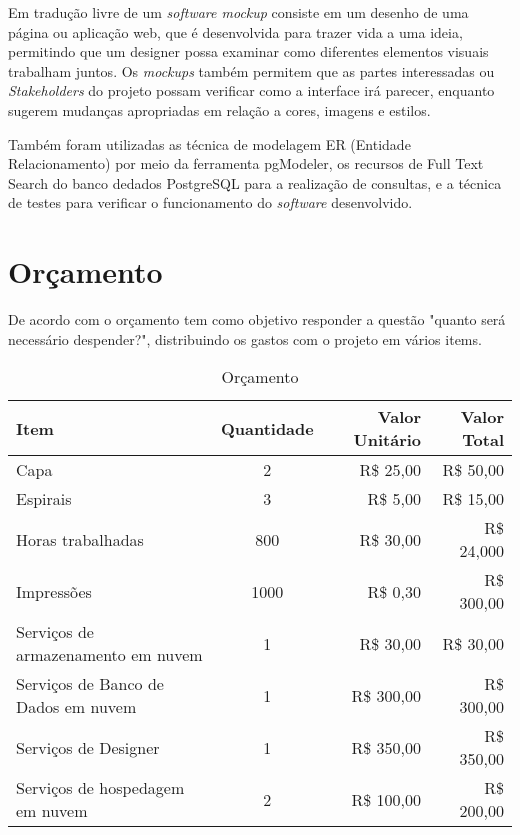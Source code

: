 Em tradução livre de \cite{uzayr:mockups} um \emph{software mockup}
consiste em um desenho de uma página ou aplicação web,
que é desenvolvida para trazer vida a uma ideia, permitindo
que um designer possa examinar como diferentes elementos visuais
trabalham juntos. Os \emph{mockups} também permitem que as partes
interessadas ou \emph{Stakeholders} do projeto possam verificar como a
interface irá parecer, enquanto sugerem mudanças
apropriadas em relação a cores, imagens e estilos.

Também foram utilizadas as técnica de modelagem ER (Entidade Relacionamento)
por meio da ferramenta pgModeler, os recursos de Full Text Search do banco dedados
PostgreSQL para a realização de consultas, e a técnica de testes para verificar
o funcionamento do \emph{software} desenvolvido.


\section{Orçamento} \label{sec:budget}

De acordo com \citep[p. 128]{LAKATOS2021:metodologia} o orçamento
tem como objetivo responder a questão "quanto será necessário
despender?", distribuindo os gastos com o projeto em vários items.

\begin{table}[H]
    \caption{Orçamento}
    \begin{tabular}{|p{6.4cm}|c|r|r|}
        \hline
        {\textbf{Item}}                         & {\textbf{Quantidade}} & {\textbf{Valor Unitário}} & {\textbf{Valor Total}} \\ \hline
        {{Capa}}                                & {2}                   & {R\$ 25,00 }              & {R\$ 50,00}            \\ \hline
        {{Espirais}}                            & {3}                   & {R\$ 5,00 }               & {R\$ 15,00}            \\ \hline
        {{Horas trabalhadas}}                   & {800}                 & {R\$ 30,00 }              & {R\$ 24,000}           \\ \hline
        {{Impressões}}                          & {1000}                & {R\$ 0,30 }               & {R\$ 300,00}           \\ \hline
        {{Serviços de armazenamento em nuvem}}  & {1}                   & {R\$ 30,00 }              & {R\$ 30,00}            \\ \hline
        {{Serviços de Banco de Dados em nuvem}} & {1}                   & {R\$ 300,00 }             & {R\$ 300,00}           \\ \hline
        {{Serviços de Designer}}                & {1}                   & {R\$ 350,00 }             & {R\$ 350,00}           \\ \hline
        {{Serviços de hospedagem em nuvem}}     & {2}                   & {R\$ 100,00 }             & {R\$ 200,00}           \\ \hline
    \end{tabular}
\end{table}

